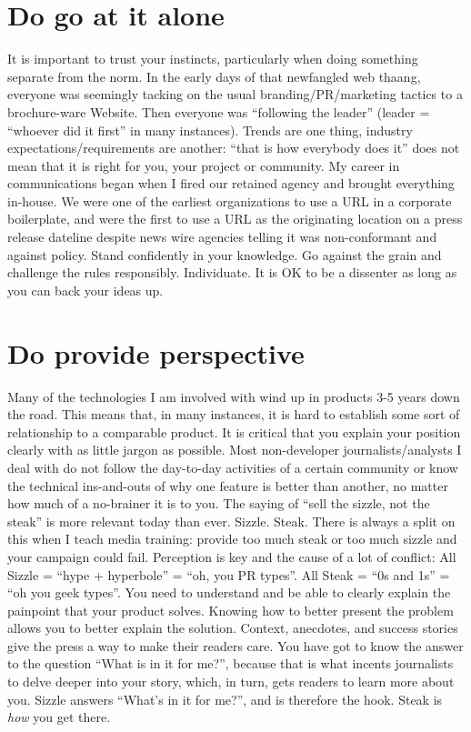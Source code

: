 \section*{Do go at it alone}
It is important to trust your instincts, particularly when doing something
separate from the norm. In the early days of that newfangled web thaang,
everyone was seemingly tacking on the usual branding/PR/marketing tactics to a
brochure-ware Website. Then everyone was ``following the leader'' (leader = ``whoever did
it first'' in many instances). Trends are one thing, industry
expectations/requirements are another: ``that is how everybody does it'' does not
mean that it is right for you, your project or community. My career in
communications began when I fired our retained agency and brought everything
in-house. We were one of the earliest organizations to use a URL in a corporate
boilerplate, and were the first to use a URL as the originating location on a
press release dateline despite news wire agencies telling it was
non-conformant and against policy. Stand confidently in your knowledge. Go
against the grain and challenge the rules responsibly. Individuate. It is OK to be a
dissenter as long as you can back your ideas up.

\section*{Do provide perspective}
Many of the technologies I am involved with wind up in products 3-5 years down
the road. This means that, in many instances, it is hard to establish some sort
of relationship to a comparable product. It is critical that you explain your
position clearly with as little jargon as possible. Most non-developer
journalists/analysts I deal with do not follow the day-to-day activities of a
certain community or know the technical ins-and-outs of why one feature is
better than another, no matter how much of a no-brainer it is to you. The
saying of ``sell the sizzle, not the steak'' is more relevant today than ever.
Sizzle. Steak. There is always a split on this when I teach media training:
provide too much steak or too much sizzle and your campaign could fail.
Perception is key and the cause of a lot of conflict: All Sizzle = ``hype +
hyperbole'' = ``oh, you PR types''. All Steak = ``0s and 1s'' = ``oh you geek types''.
You need to understand and be able to clearly explain the painpoint that your product
solves. Knowing how to better present the problem allows you to better explain the
solution. Context, anecdotes, and success stories give the press a way to make their
readers care. You have got to know the answer to the question ``What is in it for
me?'', because that is what incents journalists to delve deeper into your story, which,
in turn, gets readers to learn more about you. Sizzle answers ``What’s in it for me?'',
and is therefore the hook. Steak is \textit{how} you get there.

